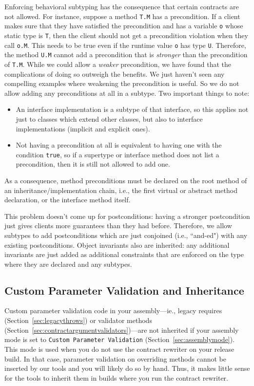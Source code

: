\documentclass{article}
\newcommand{\code}[1]{\lstinline{#1}}
\begin{document}
Enforcing behavioral subtyping has the consequence that certain
contracts are not allowed.  For instance, suppose a method \code{T.M}
has a precondition.  If a client makes sure that they have satisfied
the precondition and has a variable \code{o} whose static type is
\code{T}, then the client should not get a precondition violation when
they call \code{o.M}.  This needs to be true even if the runtime value
\code{o} has type \code{U}.  Therefore, the method \code{U.M} cannot
add a precondition that is {\em stronger} than the precondition of
\code{T.M}.  While we could allow a {\em weaker} precondition, we have
found that the complications of doing so outweigh the benefits.  We
just haven't seen any compelling examples where weakening the
precondition is useful.  So we do not allow adding any preconditions
at all in a subtype.  Two important things to note:
\begin{itemize}
\item An interface implementation is a subtype of that interface, so
  this applies not just to classes which extend other classes, but
  also to interface implementations (implicit and explicit ones).
\item Not having a precondition at all is equivalent to having one
  with the condition \code{true}, so if a supertype or interface
  method does not list a precondition, then it is still not allowed to
  add one.
\end{itemize}
As a consequence, method preconditions must be declared on the root
method of an inheritance/implementation chain, i.e., the first virtual
or abstract method declaration, or the interface method itself.

This problem doesn't come up for postconditions: having a stronger
postcondition just gives clients more guarantees than they had before.
Therefore, we allow subtypes to add postconditions which are just
conjoined (i.e., ``and-ed") with any existing postconditions.  Object
invariants also are inherited: any additional invariants are just
added as additional constraints that are enforced on the type where
they are declared and any subtypes.

\subsection{Custom Parameter Validation and Inheritance}
Custom parameter validation code in your assembly---ie., legacy requires
(Section~\ref{sec:legacythrows}) or validator methods
(Section~\ref{sec:contractargumentvalidators})---are not inherited if
your assembly mode is set to \code{Custom Parameter Validation}
(Section~\ref{sec:assemblymode}). This mode is used when you do not
use the contract rewriter on your release build. In that case,
parameter validation on overriding methods cannot be inserted by our
tools and you will likely do so by hand. Thus, it makes little sense
for the tools to inherit them in builds where you run the contract
rewriter.
\end{document}
